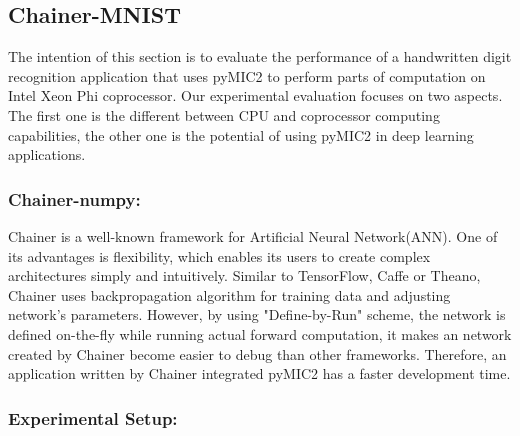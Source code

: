 \subsection{Chainer-MNIST}
%
The intention of this section is to evaluate the performance of a handwritten digit recognition application that uses pyMIC2 to perform parts of computation on Intel Xeon Phi coprocessor. Our experimental evaluation focuses on two aspects. The first one is the different between CPU and coprocessor computing capabilities, the other one is the potential of using pyMIC2 in deep learning applications.
\subsubsection{Chainer-numpy:}
%
Chainer is a well-known framework for Artificial Neural Network(ANN). One of its advantages is flexibility, which enables its users to create complex architectures simply and intuitively. Similar to TensorFlow, Caffe or Theano, Chainer uses backpropagation algorithm \cite{backprop} for training data and adjusting network's parameters. However, by using "Define-by-Run" scheme,  the network is defined on-the-fly while running actual forward computation, it makes an network created by Chainer become easier to debug than other frameworks. Therefore, an application written by Chainer integrated pyMIC2 has a faster development time.
%

\subsubsection{Experimental Setup:}
%



